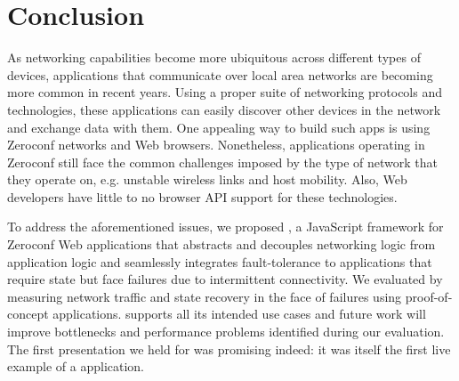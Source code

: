\section{Conclusion}
\label{sec:conclusion}

As networking capabilities become more ubiquitous across different types of devices, applications that communicate over local area networks are becoming more common in recent years.
Using a proper suite of networking protocols and technologies, these applications can easily discover other devices in the network and exchange data with them.
One appealing way to build such apps is using Zeroconf networks and Web browsers.
Nonetheless, applications operating in Zeroconf still face the common challenges imposed by the type of network that they operate on, e.g. unstable wireless links and host mobility. 
Also, Web developers have little to no browser API support for these technologies.

To address the aforementioned issues, we proposed \APINameNoSpace, a JavaScript framework for Zeroconf Web applications that abstracts and decouples networking logic from application logic and seamlessly integrates fault-tolerance to applications that require state but face failures due to intermittent connectivity. We evaluated \APIName by measuring network traffic and state recovery in the face of failures using proof-of-concept applications. \APIName supports all its intended use cases and future work will improve bottlenecks and performance problems identified during our evaluation. The first presentation we held for \APIName was promising indeed: it was itself the first live example of a \APIshort application. 
